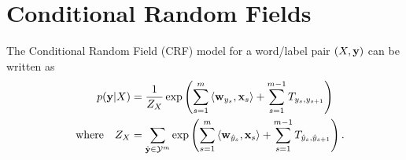 \documentclass[11pt]{report}
\begin{document}
\maketitle

\section{Conditional Random Fields}
The Conditional Random Field (CRF) model for a word/label pair $(X, \mathbf{\boldsymbol{y}})$ can be written as
\begin{align}
	\label{eq:crf}
	p(\mathbf{\boldsymbol{y}} | X ) &= \frac{1}{Z_X} \exp \left(\sum_{s=1}^m \left\langle \mathbf{\boldsymbol{w}}_{y_s},\mathbf{\boldsymbol{x}}_s \right\rangle + \sum_{s=1}^{m-1} T_{y_s, y_{s+1}}\right) \\
	{\quad \text{where} \quad} Z_X &= \sum_{\hat{\mathbf{\boldsymbol{y}}} \in \mathcal{Y}^m} \exp \left(\sum_{s=1}^m \left\langle \mathbf{\boldsymbol{w}}_{\hat{y}_s},\mathbf{\boldsymbol{x}}_s \right\rangle + \sum_{s=1}^{m-1} T_{\hat{y}_s, \hat{y}_{s+1}}\right).
\end{align}
\end{document}
